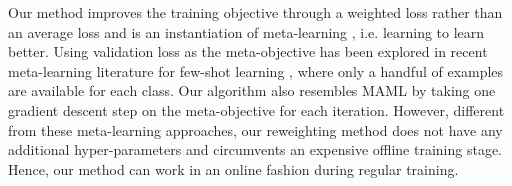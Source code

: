 Our method improves the training objective through a weighted loss rather than an average loss and
is an instantiation of meta-learning \cite{metalearn,lakemetalearn,l2l}, i.e. learning to learn
better. Using validation loss as the meta-objective has been explored in recent meta-learning
literature for few-shot learning \cite{ravi2017oneshot,metafewshot,hpernet}, where only a handful of
examples are available for each class. Our algorithm also resembles MAML \cite{maml} by taking one
gradient descent step on the meta-objective for each iteration. However, different from these
meta-learning approaches, our reweighting method does not have any additional hyper-parameters and
circumvents an expensive offline training stage. Hence, our method can work in an online fashion
during regular training.
